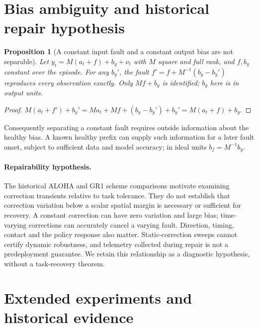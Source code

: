 \documentclass{article}
\newtheorem{proposition}{Proposition}
\begin{document}
\section{Bias ambiguity and historical repair hypothesis}
\label{sec:theory}

\begin{proposition}[A constant input fault and a constant output bias are not separable]
\label{prop:sep}
Let $y_t = M(a_t + f) + b_y + \nu_t$ with $M$ square and full rank, and $f,b_y$ constant over
the episode. For any $b_y'$, the fault $f' = f + M^{-1}(b_y - b_y')$ reproduces every observation
exactly. Only $Mf + b_y$ is identified; $b_y$ here is in output units.
\end{proposition}
\begin{proof}
$M(a_t+f') + b_y' = M a_t + Mf + (b_y - b_y') + b_y' = M(a_t + f) + b_y$.
\end{proof}
\noindent Consequently separating a constant fault requires outside information about the
healthy bias. A known healthy prefix can supply such information for a later fault onset,
subject to sufficient data and model accuracy; in ideal units $b_f=M^{-1}b_y$.

\paragraph{Repairability hypothesis.}\label{hyp:repair}
The historical ALOHA and GR1 scheme comparisons motivate examining correction transients
relative to task tolerance. They do not establish that correction variation below a scalar
spatial margin is necessary or sufficient for recovery. A constant correction can have
zero variation and large bias; time-varying corrections can accurately cancel a varying
fault. Direction, timing, contact and the policy response also matter. Static-correction
sweeps cannot certify dynamic robustness, and telemetry collected during repair is not a
predeployment guarantee. We retain this relationship as a diagnostic hypothesis, without
a task-recovery theorem.

\section{Extended experiments and historical evidence}
\label{sec:exp}
\end{document}
